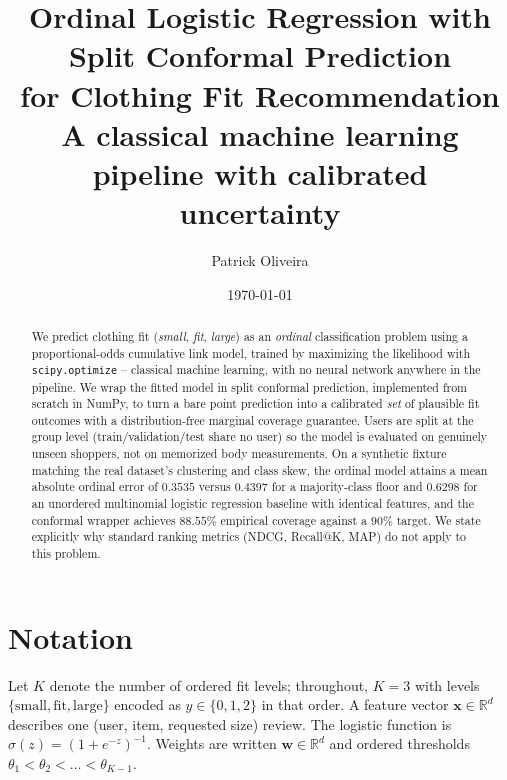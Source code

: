 \documentclass[11pt,a4paper]{article}
\title{\textbf{Ordinal Logistic Regression with Split Conformal Prediction}\\[0.4em]
\large for Clothing Fit Recommendation\\
\large A classical machine learning pipeline with calibrated uncertainty}
\author{Patrick Oliveira}
\date{\today}
\newcommand{\wvec}{\mathbf{w}}
\newcommand{\xvec}{\mathbf{x}}
\begin{document}
\maketitle

\begin{abstract}
We predict clothing fit (\emph{small}, \emph{fit}, \emph{large}) as an
\emph{ordinal} classification problem using a proportional-odds cumulative
link model, trained by maximizing the likelihood with
\texttt{scipy.optimize} -- classical machine learning, with no neural
network anywhere in the pipeline. We wrap the fitted model in split
conformal prediction, implemented from scratch in NumPy, to turn a bare
point prediction into a calibrated \emph{set} of plausible fit outcomes with
a distribution-free marginal coverage guarantee. Users are split at the
group level (train/validation/test share no user) so the model is evaluated
on genuinely unseen shoppers, not on memorized body measurements. On a
synthetic fixture matching the real dataset's clustering and class skew, the
ordinal model attains a mean absolute ordinal error of
$0.3535$ versus $0.4397$ for a majority-class floor and
$0.6298$ for an unordered multinomial logistic regression baseline with
identical features, and the conformal wrapper achieves
$88.55\%$ empirical coverage against a $90\%$ target. We state explicitly
why standard ranking metrics (NDCG, Recall@K, MAP) do not apply to this
problem.
\end{abstract}

\tableofcontents
\newpage

\section{Notation}
\label{sec:notation}

Let $K$ denote the number of ordered fit levels; throughout, $K = 3$ with
levels $\{\text{small}, \text{fit}, \text{large}\}$ encoded as
$y \in \{0, 1, 2\}$ in that order. A feature vector $\xvec \in \mathbb{R}^d$
describes one (user, item, requested size) review. The logistic function is
$\sigma(z) = (1 + e^{-z})^{-1}$. Weights are written $\wvec \in \mathbb{R}^d$
and ordered thresholds $\theta_1 < \theta_2 < \dots < \theta_{K-1}$.











\end{document}
